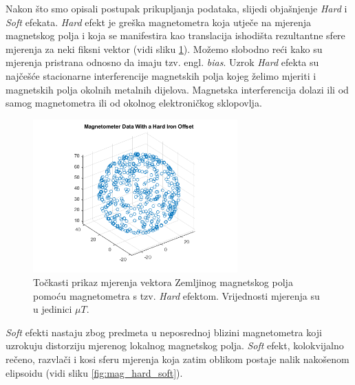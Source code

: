 \documentclass[times, utf8, diplomski, numeric]{templates/template}
\begin{document}
{{{{                Nakon što smo opisali postupak prikupljanja podataka, slijedi objašnjenje \emph{Hard} i \emph{Soft} efekata. \emph{Hard} efekt je greška magnetometra koja utječe na mjerenja magnetskog polja i koja se  manifestira kao translacija ishodišta rezultantne sfere mjerenja za neki fiksni vektor (vidi sliku \ref{fig:mag_hard}). Možemo slobodno reći kako su mjerenja pristrana odnosno da imaju tzv. engl. \emph{bias}. Uzrok \emph{Hard} efekta su najčešće stacionarne interferencije magnetskih polja kojeg želimo mjeriti i magnetskih polja okolnih metalnih dijelova. Magnetska interferencija dolazi ili od samog magnetometra ili od okolnog elektroničkog sklopovlja. 

                \begin{figure}[h!]
                \centering
                \includegraphics[width=0.7\textwidth]{images/mag_hard.png}
                \caption{Točkasti prikaz mjerenja vektora Zemljinog magnetskog polja pomoću magnetometra s tzv. \emph{Hard} efektom. Vrijednosti mjerenja su u jedinici $\mu T$.}
                \label{fig:mag_hard}
                \end{figure}

                \emph{Soft} efekti nastaju zbog predmeta u neposrednoj blizini magnetometra koji uzrokuju distorziju mjerenog lokalnog magnetskog polja. \emph{Soft} efekt, kolokvijalno rečeno, razvlači i kosi sferu mjerenja koja zatim oblikom postaje nalik nakošenom elipsoidu (vidi sliku \ref{fig:mag_hard_soft}).

}}}}
\end{document}
